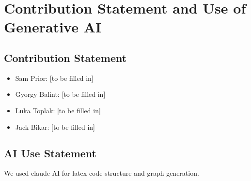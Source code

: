 \documentclass[10pt,a4paper]{article}
\begin{document}
\section{Contribution Statement and Use of Generative AI}

\subsection*{Contribution Statement}

\begin{itemize}
  \item Sam Prior: [to be filled in]
  \item Gyorgy Balint: [to be filled in]
  \item Luka Toplak: [to be filled in]
  \item Jack Bikar: [to be filled in]
\end{itemize}

\subsection*{AI Use Statement}

We used claude AI for latex code structure and graph generation.
\end{document}

